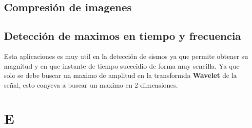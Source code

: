 \documentclass[]{IEEEtran}
\newcommand{\wavelet}{\hspace{.002cm}\textbf{Wavelet}\hspace{.002cm} }
\begin{document}
    \subsection{Compresión de imagenes}

    

    \subsection{Detección de maximos en tiempo y frecuencia}

    Esta aplicaciones es muy util en la detección de sismos ya que permite obtener su
    magnitud y en que instante de tiempo sucecidio de forma muy sencilla. 
    Ya que solo se debe buscar un maximo de amplitud en la transformda \wavelet de la señal, 
    esto conyeva a buscar un maximo en 2 dimensiones. 

    \section{E}
\end{document}
